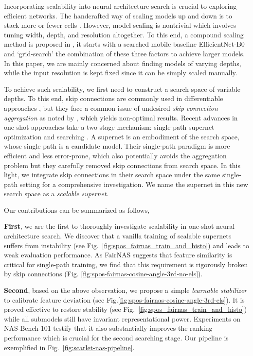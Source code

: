\documentclass[10pt,twocolumn,letterpaper]{article}
\theoremstyle{definition}
\begin{document}
Incorporating scalability into neural architecture search is crucial to exploring efficient networks. The handcrafted way of scaling models up and down is to stack more or fewer cells \cite{he2016deep,zoph2018learning}. However, model scaling is nontrivial which involves tuning width, depth, and resolution altogether. To this end, a compound scaling method is proposed in \cite{tan2019efficientnet}, it starts with a searched mobile baseline EfficientNet-B0 and `grid-search' the combination of these three factors to achieve larger models. In this paper, we are mainly concerned about finding models of varying depths, while the input resolution is kept fixed since it can be simply scaled manually.

To achieve such scalability, we first need to construct a search space of variable depths. To this end, skip connections are commonly used in differentiable approaches \cite{cai2018proxylessnas,wu2018fbnet}, but they face a common issue of undesired \emph{skip connection aggregation} as noted by \cite{chen2019progressive,zela2019understanding}, which yields non-optimal results. Recent advances in one-shot approaches take a two-stage mechanism: single-path supernet optimization and searching \cite{guo2019single,chu2019fairnas}. A supernet is an embodiment of the search space, whose single path is a candidate model. 
Their single-path paradigm is more efficient and less error-prone, which also potentially avoids the aggregation problem but they carefully removed skip connections from search space. In this light, we integrate skip connections in their search space under the same single-path setting for a comprehensive investigation. We name the supernet in this new search space as a \emph{scalable supernet}.

Our contributions can be summarized as follows,

\textbf{First}, we are the first to thoroughly investigate scalability in one-shot neural architecture search. We discover that a vanilla training of scalable supernets suffers from instability (see Fig.~\ref{fig:spos_fairnas_train_and_histo}) and leads to weak evaluation performance. As FairNAS \cite{chu2019fairnas} suggests that feature similarity is critical for single-path training, we find that this requirement is rigorously broken by skip connections (Fig. \ref{fig:spos-fairnas-cosine-angle-3rd-no-els}).

\textbf{Second}, based on the above observation, we propose a simple \emph{learnable stabilizer} to calibrate feature deviation (see Fig.\ref{fig:spos-fairnas-cosine-angle-3rd-els}). It is proved effective to restore stability (see Fig.~\ref{fig:spos_fairnas_train_and_histo}) while all submodels still have invariant representational power.  Experiments on NAS-Bench-101 \cite{ying2019bench} testify that it also substantially improves the ranking performance which is crucial for the second searching stage. Our pipeline is exemplified in Fig.~\ref{fig:scarlet-nas-pipeline}.
\end{document}
